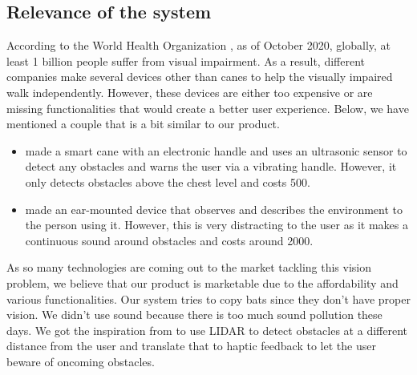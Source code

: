 \documentclass{article}
\begin{document}
\subsection{Relevance of the system} 
According to the World Health Organization \cite{WHO}, as of October 2020, globally, at least 1 billion people suffer from visual impairment. As a result, different companies make several devices other than canes to help the visually impaired walk independently. However, these devices are either too expensive or are missing functionalities that would create a better user experience. Below, we have mentioned a couple that is a bit similar to our product.
\begin{itemize}
\item \cite{Home} made a smart cane with an electronic handle and uses an ultrasonic sensor to detect any obstacles and warns the user via a vibrating handle. However, it only detects obstacles above the chest level and costs 500.


\item \cite{HORUSTECHNOLOGY} made an ear-mounted device that observes and describes the environment to the person using it. However, this is very distracting to the user as it makes a continuous sound around obstacles and costs around 2000.
\end{itemize}
As so many technologies are coming out to the market tackling this vision problem, we believe that our product is marketable due to the affordability and various functionalities.
\newline
Our system tries to copy bats since they don’t have proper vision. We didn't use sound because there is too much sound pollution these days. We got the inspiration from \cite{StuffMadeHere} to use LIDAR to detect obstacles at a different distance from the user and translate that to haptic feedback to let the user beware of oncoming obstacles.
\end{document}
